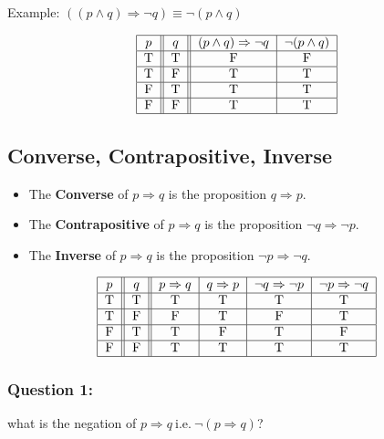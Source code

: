 \documentclass[12pt,a4paper]{article}
\begin{document}
    Example: \(((p \wedge q) \Rightarrow \neg q) \equiv \neg(p \wedge q)\)


 \begin{align*}
    \begin{tabular}{|c||c||c|c|}
        \hline \(p\) & \(q\) & \((p \wedge q) \Rightarrow \neg q\) & \(\neg(p \wedge q)\) \\
        \hline T & T & F & F \\
        \hline T & F & T & T \\
        \hline F & T & T & T \\
        \hline F & F & T & T \\
        \hline
        \end{tabular}
\end{align*}
\vspace{10pt}

\subsection{Converse, Contrapositive, Inverse}
\begin{itemize}
    \item The \textbf{Converse} of \(p \Rightarrow q\) is the proposition \(q \Rightarrow p\).
    \item  The \textbf{Contrapositive} of \(p \Rightarrow q\) is the proposition \(\neg q \Rightarrow \neg p\).
    \item The \textbf{Inverse} of \(p \Rightarrow q\) is the proposition \(\neg p \Rightarrow \neg q\).
\end{itemize}
 \begin{align*}
    \begin{tabular}{|c||c||c|c|c|c|}
        \hline \(p\) & \(q\) & \(p \Rightarrow q\) & \(q \Rightarrow p\) & \(\neg q \Rightarrow \neg p\) & \(\neg p \Rightarrow \neg q\) \\
        \hline T & T & T & T & T & T \\
        \hline T & F & F & T & F & T \\
        \hline F & T & T & F & T & F \\
        \hline F & F & T & T & T & T \\
        \hline
        \end{tabular}  
\end{align*}

\subsubsection*{Question 1:} what is the negation of \(p \Rightarrow q  \ \text{i.e.} \ \neg(p \Rightarrow q)\)?
\end{document}
